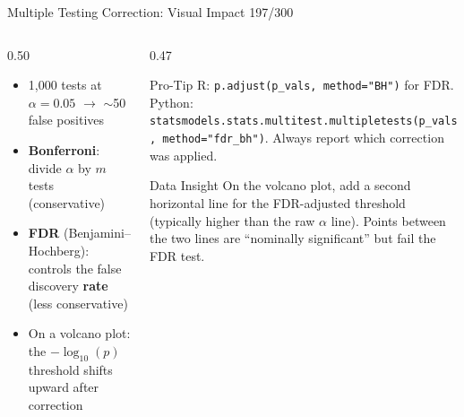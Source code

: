 \documentclass[10pt]{beamer}
\newcommand{\smark}[1]{\hfill{\scriptsize\color{codegray}#1}}
\begin{document}
\begin{frame}{Multiple Testing Correction: Visual Impact}
\smark{197/300}
\begin{columns}[T]
\begin{column}{0.50\textwidth}
\begin{itemize}
    \item 1{,}000 tests at $\alpha = 0.05$ $\to$ $\sim$50 false positives
    \item \textbf{Bonferroni}: divide $\alpha$ by $m$ tests (conservative)
    \item \textbf{FDR} (Benjamini--Hochberg): controls the false discovery \textbf{rate} (less conservative)
    \item On a volcano plot: the $-\log_{10}(p)$ threshold shifts upward after correction
\end{itemize}
\end{column}
\begin{column}{0.47\textwidth}
\begin{alertblock}{Pro-Tip}
    \scriptsize R: \texttt{p.adjust(p\_vals, method="BH")} for FDR. Python: \texttt{statsmodels.stats.multitest.multipletests(p\_vals, method="fdr\_bh")}. Always report which correction was applied.
\end{alertblock}
\vspace{0.1cm}
\begin{exampleblock}{Data Insight}
    \scriptsize On the volcano plot, add a second horizontal line for the FDR-adjusted threshold (typically higher than the raw $\alpha$ line). Points between the two lines are ``nominally significant'' but fail the FDR test.
\end{exampleblock}
\end{column}
\end{columns}
\end{frame}
\end{document}
